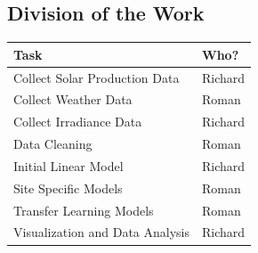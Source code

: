 \documentclass[11pt, fullpage,letterpaper]{article}
\begin{document}
\subsection*{Division of the Work}

\begin{center}
\begin{tabular}{|l|l|}
    \hline
    Task & Who?\\
    \hline
    Collect Solar Production Data & Richard \\
    \hline
    Collect Weather Data & Roman \\
    \hline
    Collect Irradiance Data & Richard \\
    \hline
    Data Cleaning & Roman \\
    \hline
    Initial Linear Model & Richard \\
    \hline
    Site Specific Models & Roman \\
    \hline
    Transfer Learning Models & Roman \\
    \hline
    Visualization and Data Analysis & Richard \\
    \hline
\end{tabular}
\end{center}
\end{document}
